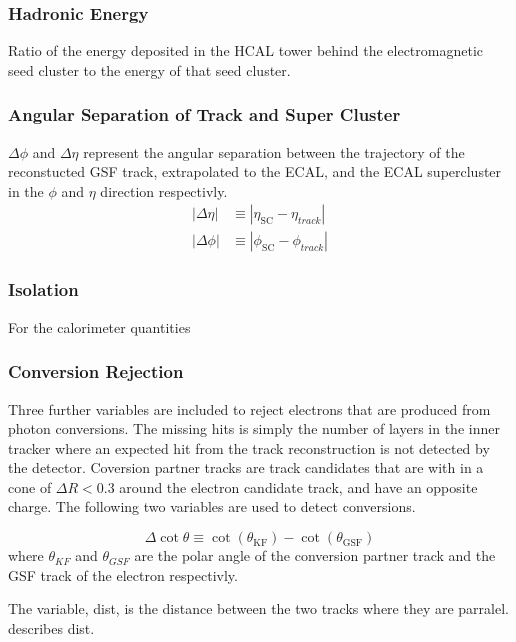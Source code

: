 \subsubsection{Hadronic Energy}
Ratio of the energy deposited in the HCAL tower behind the electromagnetic seed
cluster to the energy of that seed cluster.

\subsubsection{Angular Separation of Track and Super Cluster}
$\Delta\phi$ and $\Delta\eta$ represent the angular separation between the
trajectory of the reconstucted GSF track, extrapolated to the ECAL, and the ECAL supercluster in the $\phi$
and $\eta$ direction respectivly.
\begin{align}
|\Delta\eta| &\equiv |\eta_{\text{SC}} - \eta_{track}|\\
|\Delta\phi| &\equiv |\phi_{\text{SC}} - \phi_{track}|
\end{align}

\subsubsection{Isolation}
For the calorimeter quantities

\subsubsection{Conversion Rejection}
Three further variables are included to reject electrons that are produced from
photon conversions. The missing hits is simply the number of layers in the inner
tracker where an expected hit from the track reconstruction is not detected by
the detector.
Coversion partner tracks are track candidates that are with in a cone of $\Delta
R < 0.3$ around the electron candidate track, and have an opposite charge. The
following two variables are used to detect  conversions.

\begin{equation}
\Delta \cot \theta \equiv \cot(\theta_{\text{KF}}) - \cot(\theta_{\text{GSF}})
\end{equation}
where $\theta_{KF}$ and $\theta_{GSF}$ are the polar angle of the conversion
partner track and the GSF track of the electron respectivly.

The variable, dist, is the distance between the two tracks where they are
parralel.  describes dist.

